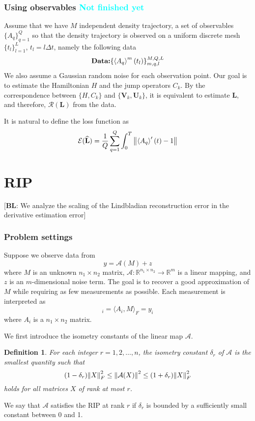 \documentclass[10pt]{article}  %
\theoremstyle{plain}
\newtheorem{definition}[thm]{Definition}
\numberwithin{equation}{section}
\newcommand{\innerp}[1]{\langle{#1}\rangle}
\def\mE{\mathcal{E}}
\def\mA{\mathcal{A}}
\def\mR{\mathcal{R}}
\def\R{\mathbb{R}}
\newcommand{\bL}{\mathbf{L}}
\newcommand{\bV}{\mathbf{V}}
\newcommand{\bU}{\mathbf{U}}
\newcommand{\QL}[1]{\textcolor{cyan}{{#1}}}
\newcommand{\bl}[1]{{\color{magenta} [\textbf{BL}: #1]}}
\renewcommand{\R}{\mathbb{R}}
\begin{document}
\subsubsection{Using observables \QL{Not finished yet}}
Assume that we have $M$ independent density trajectory, a set of observables $\{A_q\}_{q = 1}^Q$ so that the density trajectory is observed on a uniform discrete mesh $\{t_l\}_{l = 1}^L$, $t_l = l \Delta t$, namely the following data
\begin{equation}
	\textbf{Data:} \{\expval{A_q}^m (t_l)\}_{m, q, l}^{M, Q, L}
\end{equation}
We also assume a Gaussian random noise for each observation point. Our goal is to estimate the Hamiltonian $H$ and the jump operators $C_k$. By the correspondence between $\{H, C_k\}$ and $\{\bV_k, \bU_k\}$, it is equivalent to estimate $\bL$, and therefore, $\mR(\bL)$ from the data. 

It is natural to define the loss function as 
\begin{equation}
	\mE(\widehat{\bL}) = \frac{1}{Q}\sum_{q = 1}^Q\int_0^T \norm{\expval{A_q}'(t) - 1}
\end{equation}




\section{RIP}

\bl{We analyze the scaling of the Lindbladian reconstruction error in the derivative estimation error}

\subsubsection{Problem settings}
Suppose we observe data from 
\begin{equation}
	y = \mA(M) + z
\end{equation}
where $M$ is an unknown $n_1 \times n_2$ matrix, $\mA : \R^{n_1\times n_2} \to \R^m$ is a linear mapping, and $z$ is an $m$-dimensional noise term. The goal is to recover a good approximation of $M$ while requiring as few measurements as possible. Each measurement is interpreted as 
\begin{equation}
	[\mA(M)]_i = \innerp{A_i, M}_F = y_i
\end{equation}
where $A_i$ is a $n_1\times n_2$ matrix.





We first introduce the isometry constants of the linear map $\mA$. 
\begin{definition}
	For each integer $r = 1, 2, \dots , n$, the isometry constant $\delta_r$ of $\mA$ is the smallest quantity such that 
	\begin{equation}
		(1 - \delta_r)\norm{X}_F^2 \leq \norm{\mA(X)}^2 \leq (1 + \delta_r) \norm{X}_F^2
	\end{equation}
	holds for all matrices $X$ of rank at most $r$. 
\end{definition}
We say that $\mA$ satisfies the RIP at rank $r$ if $\delta_r$ is bounded by a sufficiently small constant between 0 and 1. 
\end{document}
